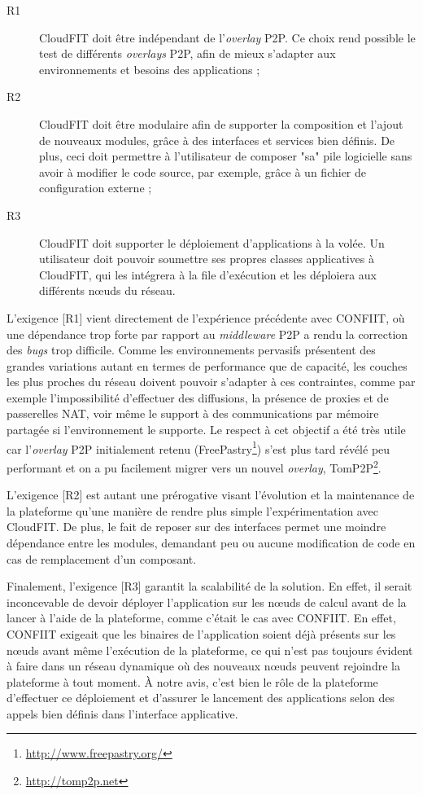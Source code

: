 \begin{description}
	\item [R1] CloudFIT doit être indépendant de l'\textit{overlay} P2P. Ce choix rend possible le test de différents \textit{overlays} P2P, afin de mieux s'adapter aux environnements et besoins des applications ;
	\item [R2] CloudFIT doit être modulaire afin de supporter la composition et l'ajout de nouveaux modules, grâce à des interfaces et services bien définis. De plus, ceci doit permettre à l'utilisateur de composer "sa" pile logicielle sans avoir à modifier le code source, par exemple, grâce à un fichier de configuration externe ;
	\item [R3] CloudFIT doit supporter le déploiement d'applications à la volée. Un utilisateur doit pouvoir soumettre ses propres classes applicatives à CloudFIT, qui les intégrera à la file d'exécution et les déploiera aux différents n{\oe}uds du réseau.
\end{description} 


L'exigence [R1] vient directement de l'expérience précédente avec CONFIIT, où une dépendance trop forte par rapport au \textit{middleware} P2P a rendu la correction des \textit{bugs} trop difficile.  Comme les environnements pervasifs présentent des grandes variations autant en termes de performance que de capacité, les couches les plus proches du réseau doivent pouvoir s'adapter à ces contraintes, comme par exemple l'impossibilité d'effectuer des diffusions, la présence de proxies et de passerelles NAT, voir même le support à des communications par mémoire partagée si l'environnement le supporte. Le respect à cet objectif a été très utile car l'\textit{overlay} P2P initialement retenu (FreePastry\footnote{\url{http://www.freepastry.org/}}) s'est plus tard révélé peu performant et on a pu facilement migrer vers un nouvel \textit{overlay}, TomP2P\footnote{\url{http://tomp2p.net}}. 

L'exigence [R2] est autant une prérogative visant l'évolution et la maintenance de la plateforme qu'une manière de rendre plus simple l'expérimentation avec CloudFIT. De plus, le fait de reposer sur des interfaces permet une moindre dépendance entre les modules, demandant peu ou aucune modification de code en cas de remplacement d'un composant. 

Finalement, l'exigence [R3] garantit la scalabilité de la solution. En effet, il serait inconcevable de devoir déployer l’application sur les n{\oe}uds de calcul avant de la lancer à l’aide de la plateforme, comme c’était le cas avec CONFIIT. En effet, CONFIIT exigeait que les binaires de l’application soient déjà présents sur les n{\oe}uds avant même l’exécution de la plateforme, ce qui n'est pas toujours évident à faire dans un réseau dynamique où des nouveaux n{\oe}uds peuvent rejoindre la plateforme à tout moment. À notre avis, c'est bien le rôle de la plateforme d'effectuer ce déploiement et d'assurer le lancement des applications selon des appels bien définis dans l'interface applicative. 

